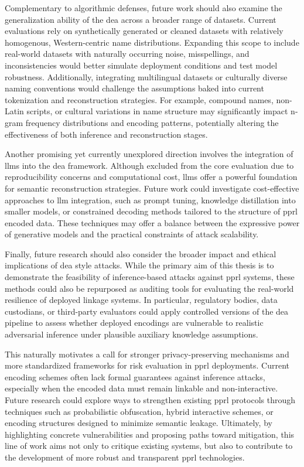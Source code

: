 Complementary to algorithmic defenses, future work should also examine the generalization ability of the \ac{dea} across a broader range of datasets.
Current evaluations rely on synthetically generated or cleaned datasets with relatively homogenous, Western-centric name distributions.
Expanding this scope to include real-world datasets with naturally occurring noise, misspellings, and inconsistencies would better simulate deployment conditions and test model robustness.
Additionally, integrating multilingual datasets or culturally diverse naming conventions would challenge the assumptions baked into current tokenization and reconstruction strategies.
For example, compound names, non-Latin scripts, or cultural variations in name structure may significantly impact n-gram frequency distributions and encoding patterns, potentially altering the effectiveness of both inference and reconstruction stages.

Another promising yet currently unexplored direction involves the integration of \ac{llm}s into the \ac{dea} framework.
Although excluded from the core evaluation due to reproducibility concerns and computational cost, \ac{llm}s offer a powerful foundation for semantic reconstruction strategies.
Future work could investigate cost-effective approaches to \ac{llm} integration, such as prompt tuning, knowledge distillation into smaller models, or constrained decoding methods tailored to the structure of \ac{pprl} encoded data.
These techniques may offer a balance between the expressive power of generative models and the practical constraints of attack scalability.

Finally, future research should also consider the broader impact and ethical implications of \ac{dea} style attacks.
While the primary aim of this thesis is to demonstrate the feasibility of inference-based attacks against \ac{pprl} systems, these methods could also be repurposed as auditing tools for evaluating the real-world resilience of deployed linkage systems.
In particular, regulatory bodies, data custodians, or third-party evaluators could apply controlled versions of the \ac{dea} pipeline to assess whether deployed encodings are vulnerable to realistic adversarial inference under plausible auxiliary knowledge assumptions.

This naturally motivates a call for stronger privacy-preserving mechanisms and more standardized frameworks for risk evaluation in \ac{pprl} deployments.
Current encoding schemes often lack formal guarantees against inference attacks, especially when the encoded data must remain linkable and non-interactive.
Future research could explore ways to strengthen existing \ac{pprl} protocols through techniques such as probabilistic obfuscation, hybrid interactive schemes, or encoding structures designed to minimize semantic leakage.
Ultimately, by highlighting concrete vulnerabilities and proposing paths toward mitigation, this line of work aims not only to critique existing systems, but also to contribute to the development of more robust and transparent \ac{pprl} technologies.


